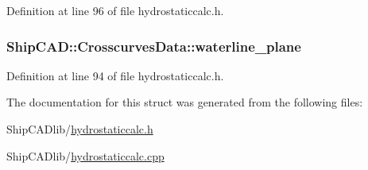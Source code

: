 Definition at line 96 of file hydrostaticcalc.\+h.

\subsubsection[{\texorpdfstring{waterline\+\_\+plane}{waterline_plane}}]{ Ship\+C\+A\+D\+::\+Crosscurves\+Data\+::waterline\+\_\+plane}\hypertarget{structShipCAD_1_1CrosscurvesData_a1ea6de1b52289e8392e8d499ae4aad04}{}\label{structShipCAD_1_1CrosscurvesData_a1ea6de1b52289e8392e8d499ae4aad04}


Definition at line 94 of file hydrostaticcalc.\+h.



The documentation for this struct was generated from the following files\+:\begin{DoxyCompactItemize}
\item 
Ship\+C\+A\+Dlib/\hyperlink{hydrostaticcalc_8h}{hydrostaticcalc.\+h}\item 
Ship\+C\+A\+Dlib/\hyperlink{hydrostaticcalc_8cpp}{hydrostaticcalc.\+cpp}\end{DoxyCompactItemize}
